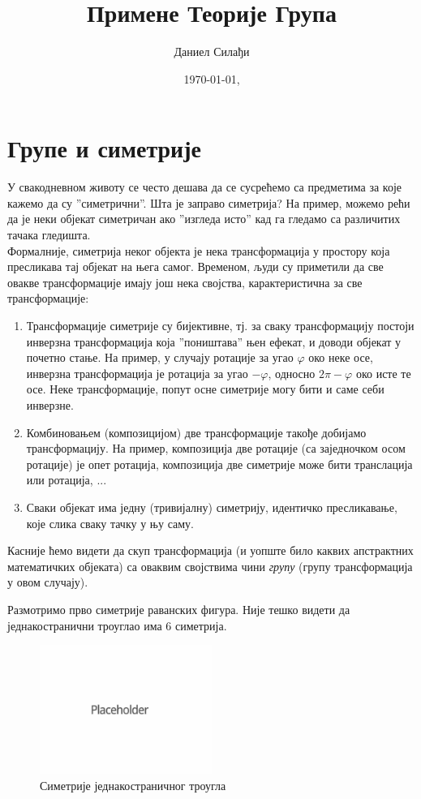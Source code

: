 \documentclass{report}
\theoremstyle{plain}
\theoremstyle{definition}
\begin{document}
\title{Примене Теорије Група}

\author{Даниел Силађи}
\date{\today, \currenttime}

\maketitle

\setcounter{tocdepth}{1}
\tableofcontents

\chapter{Групе и симетрије}
У свакодневном животу се често дешава да се сусрећемо са предметима за које
кажемо да су ''симетрични''. Шта је заправо симетрија? На пример, можемо рећи да је
неки објекат симетричан ако ''изгледа исто'' кад га гледамо са различитих тачака гледишта.\\
Формалније, симетрија неког објекта је нека трансформација у простору која пресликава
тај објекат на њега самог. Временом, људи су приметили да све овакве трансформације
имају још нека својства, карактеристична за све трансформације:
\begin{enumerate}
  \item Трансформације симетрије су бијективне, тј. за сваку трансформацију постоји инверзна трансформација која ''поништава'' њен ефекат, и доводи објекат у почетно стање. На пример, у случају ротације за угао $\varphi$ око неке осе, инверзна трансформација је ротација за угао $-\varphi$, односно $2\pi-\varphi$ око исте те осе. Неке трансформације, попут осне симетрије могу бити и саме себи инверзне.
  \item Комбиновањем (композицијом) две трансформације такође добијамо трансформацију. На пример, композиција две ротације (са заједночком осом ротације) је опет ротација, композиција две симетрије може бити транслација или ротација, ...
  \item Сваки објекат има једну (тривијалну) симетрију, идентичко пресликавање, које слика сваку тачку у њу саму.
\end{enumerate}
Касније ћемо видети да скуп трансформација (и уопште било каквих апстрактних математичких објеката) са оваквим својствима чини \emph{групу} (групу трансформација у овом случају).

Размотримо прво симетрије раванских фигура. Није тешко видети да једнакостранични троуглао има 6 симетрија.\\
\begin{figure}[h]
\centering
\includegraphics[width=0.5\textwidth]{placeholder}
\caption{Симетрије једнакостраничног троугла}
\end{figure}
\end{document}
